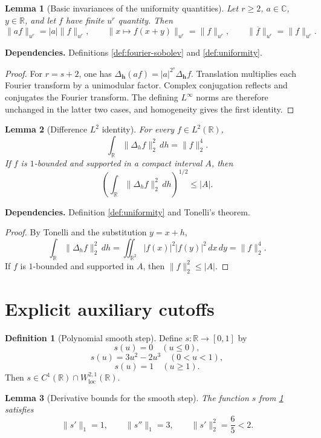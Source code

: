 \documentclass[11pt]{article}
\newtheorem{lemma}[lemma]{Lemma}
\theoremstyle{definition}
\newtheorem{definition}[definition]{Definition}
\theoremstyle{remark}
\newcommand{\R}{\mathbb R}
\newcommand{\C}{\mathbb C}
\newcommand{\1}{\mathbf 1}
\newcommand{\dd}{\,d}
\newcommand{\uNorm}[2]{\lVert #1\rVert_{u^{#2}}}
\newcommand{\lpNorm}[2]{\lVert #1\rVert_{#2}}
\newcommand{\uses}[1]{\par\smallskip\noindent\textbf{Dependencies.} #1\par\smallskip}
\begin{document}
\begin{lemma}[Basic invariances of the uniformity quantities]\label{lem:u-invariances}
Let $r\geq2$, $a\in\C$, $y\in\R$, and let $f$ have finite $u^r$ quantity.  Then
\[
\uNorm{af}r=|a|\uNorm fr,
\qquad
\uNorm{x\mapsto f(x+y)}r=\uNorm fr,
\qquad
\uNorm{\overline f}r=\uNorm fr.
\]
\end{lemma}

\uses{Definitions \ref{def:fourier-sobolev} and \ref{def:uniformity}.}

\begin{proof}
For $r=s+2$, one has
$\Delta_{\mathbf h}(af)=|a|^{2^s}\Delta_{\mathbf h}f$.
Translation multiplies each Fourier transform by a unimodular factor.  Complex conjugation reflects and conjugates the Fourier transform.  The defining $L^\infty$ norms are therefore unchanged in the latter two cases, and homogeneity gives the first identity.
\end{proof}

\begin{lemma}[Difference $L^2$ identity]\label{lem:difference-l2}
For every $f\in L^2(\R)$,
\[
\int_\R\lpNorm{\Delta_hf}2^2\dd h=\lpNorm f2^4.
\]
If $f$ is $1$-bounded and supported in a compact interval $A$, then
\[
\left(\int_\R\lpNorm{\Delta_hf}2^2\dd h\right)^{1/2}\leq\lvert A\rvert.
\]
\end{lemma}

\uses{Definition \ref{def:uniformity} and Tonelli's theorem.}

\begin{proof}
By Tonelli and the substitution $y=x+h$,
\[
\int_\R\lpNorm{\Delta_hf}2^2\dd h
=
\iint_{\R^2}|f(x)|^2|f(y)|^2\dd x\dd y
=
\lpNorm f2^4.
\]
If $f$ is $1$-bounded and supported in $A$, then $\lpNorm f2^2\leq\lvert A\rvert$.
\end{proof}

\section{Explicit auxiliary cutoffs}

\begin{definition}[Polynomial smooth step]\label{def:smooth-step}
Define $s:\R\to[0,1]$ by
\[
s(u)=0\quad(u\leq0),
\]
\[
s(u)=3u^2-2u^3\quad(0<u<1),
\]
\[
s(u)=1\quad(u\geq1).
\]
Then $s\in C^1(\R)\cap W^{2,1}_{\mathrm{loc}}(\R)$.
\end{definition}

\begin{lemma}[Derivative bounds for the smooth step]\label{lem:smooth-step-bounds}
The function $s$ from \cref{def:smooth-step} satisfies
\[
\lpNorm{s'}1=1,
\qquad
\lpNorm{s''}1=3,
\qquad
\lpNorm{s'}2^2=\frac65<2.
\]
\end{lemma}
\end{document}
